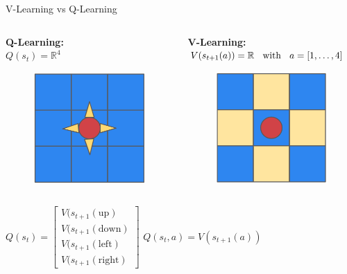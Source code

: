 \documentclass[aspectratio=169, 11pt, invertlogo]{ismll-slides}
\begin{document}
\begin{frame}[fragile]{V-Learning vs Q-Learning}
	\begin{columns}
		\begin{column}{.5\linewidth}
			\textbf{Q-Learning:} \\ [1mm]
			$Q(s_t) = \mathbb{R}^4$
			\begin{figure}
				\centering
				\includegraphics[width=.4\linewidth]{pics/maze_q}
			\end{figure}
		\end{column}
		\begin{column}{.5\linewidth}
			\textbf{V-Learning:} \\ [1mm]
			$V(s_{t+1}(a)) = \mathbb{R} \hspace{2mm} \text{ with } \hspace{2mm} a = [1, \ldots, 4]$
			\begin{figure}
				\centering
				\includegraphics[width=.4\linewidth]{pics/maze_v}
			\end{figure}
		\end{column}
	\end{columns}
	$Q(s_t) = \begin{bmatrix}
	V(s_{t+1}(\text{up}) \\
	V(s_{t+1}(\text{down}) \\
	V(s_{t+1}(\text{left}) \\
	V(s_{t+1}(\text{right}) 
	\end{bmatrix}$ \hspace{5mm}
	$Q(s_t, a) = V(s_{t+1}(a))$
\end{frame}
\end{document}
